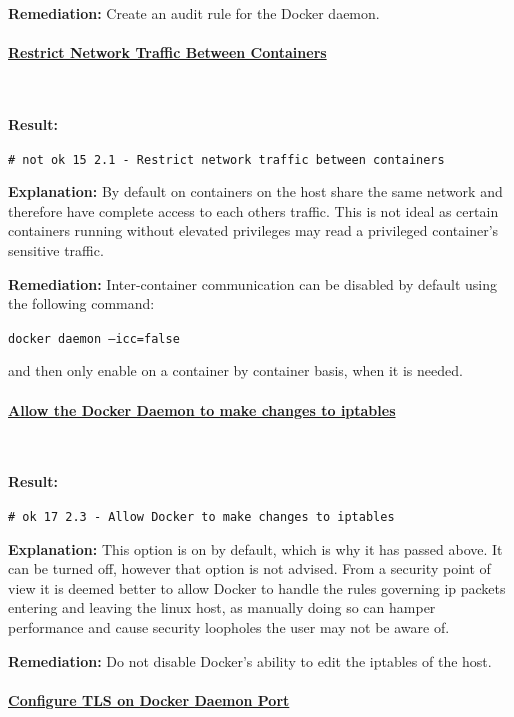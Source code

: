 \documentclass{article}
\begin{document}
\textbf{Remediation:} Create an audit rule for the Docker daemon.


\paragraph{\underline{Restrict Network Traffic Between Containers}}\mbox{}\\
\label{par:net_access}

\textbf{Result:} 

\texttt{\# not ok 15 2.1  - Restrict network traffic between containers}

\textbf{Explanation:} By default on containers on the host share the same network and therefore have complete access to each others traffic. This is not ideal as certain containers running without elevated privileges may read a privileged container's sensitive traffic. 

\textbf{Remediation:} Inter-container communication can be disabled by default using the following command:

\texttt{docker daemon --icc=false}

and then only enable on a container by container basis, when it is needed.

\paragraph{\underline{Allow the Docker Daemon to make changes to iptables}}\mbox{}\\
\label{par:iptables}

\textbf{Result:} 

\texttt{\# ok 17 2.3  - Allow Docker to make changes to iptables}

\textbf{Explanation:} This option is on by default, which is why it has passed above. It can be turned off, however that option is not advised. From a security point of view it is deemed better to allow Docker to handle the rules governing ip packets entering and leaving the linux host, as manually doing so can hamper performance and cause security loopholes the user may not be aware of.

\textbf{Remediation:} Do not disable Docker's ability to edit the iptables of the host.

\paragraph{\underline{Configure TLS on Docker Daemon Port}}\mbox{}\\
\label{par:tls}
\end{document}
